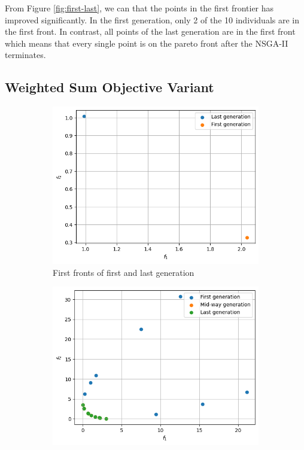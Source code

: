 From Figure \ref{fig:first-last}, we can that the points in the first frontier has improved significantly. In the first generation, only 2 of the 10 individuals are in the first front. In contrast, all points of the last generation are in the first front which means that every single point is on the pareto front after the NSGA-II terminates.

\subsection{Weighted Sum Objective Variant}

\begin{figure}[ht]
    \centering
    \hfill
    \begin{subfigure}{0.48\textwidth}
        \includegraphics[width=\textwidth]{images/p3-weighted_fronts.png}
        \caption{First fronts of first and last generation}
        \label{fig:weighted-sum-front}
    \end{subfigure}
    \hfill
    \begin{subfigure}{0.48\textwidth}
        \includegraphics[width=\textwidth]{images/p3-weighted_generations.png}

\end{subfigure}
\end{figure}
